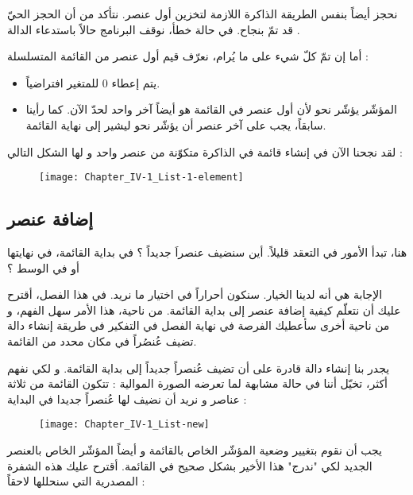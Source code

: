 نحجز أيضاً بنفس الطريقة الذاكرة اللازمة لتخزين أول عنصر. نتأكد من أن الحجز الحيّ قد تمّ بنجاح. في حالة خطأ، نوقف البرنامج حالاً باستدعاء الدالة
.

أما إن تمّ كلّ شيء على ما يُرام، نعرّف قيم أول عنصر من القائمة المتسلسلة :

\begin{itemize}
	\item يتم إعطاء $ 0 $ للمتغير
	افتراضياً.
	\item المؤشّر
	يؤشّر نحو
	لأن أول عنصر في القائمة هو أيضاً آخر واحد لحدّ الآن. كما رأينا سابقاً، يجب على آخر عنصر أن يؤشّر نحو
	ليشير إلى نهاية القائمة.
\end{itemize}

لقد نجحنا الآن في إنشاء قائمة في الذاكرة متكوّنة من عنصر واحد و لها الشكل التالي :

\begin{figure}[H]
	\centering
	\texttt{[image: Chapter\_IV-1\_List-1-element]}
\end{figure}

\subsection{إضافة عنصر}

هنا، تبدأ الأمور في التعقد قليلاً. أين سنضيف عنصراَ جديداً ؟ في بداية القائمة، في نهايتها أو في الوسط ؟

الإجابة هي أنه لدينا الخيار. سنكون أحراراً في اختيار ما نريد. في هذا الفصل، أقترح عليك أن نتعلّم كيفية إضافة عنصر إلى بداية القائمة. من ناحية، هذا الأمر سهل الفهم، و من ناحية أخرى سأعطيك الفرصة في نهاية الفصل في التفكير في طريقة إنشاء دالة تضيف عُنصُراً في مكان محدد من القائمة.

يجدر بنا إنشاء دالة قادرة على أن تضيف عُنصراً جديداً إلى بداية القائمة. و لكي نفهم أكثر، تخيّل أننا في حالة مشابهة لما تعرضه الصورة الموالية : تتكون القائمة من ثلاثة عناصر و نريد أن نضيف لها عُنصراً جديدا في البداية :

\begin{figure}[H]
	\centering
	\texttt{[image: Chapter\_IV-1\_List-new]}
\end{figure}

يجب أن نقوم بتغيير وضعية المؤشّر
الخاص بالقائمة و أيضاً المؤشّر
الخاص بالعنصر الجديد لكي "ندرج" هذا الأخير بشكل صحيح في القائمة. أقترح عليك هذه الشفرة المصدرية التي سنحللها لاحقاً :

